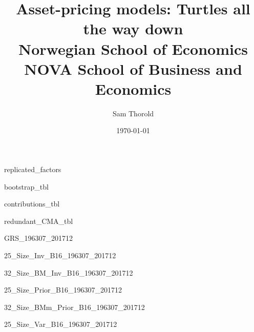 \documentclass[a4paper, 12pt]{article}
\title{
  {Asset-pricing models: Turtles all the way down}\\
  {\large Norwegian School of Economics}\\
  {\large NOVA School of Business and Economics}
}
\author{Sam Thorold}
\date{\today}
\begin{document}
\maketitle

{replicated_factors}

\begin{landscape}
{bootstrap_tbl}
\end{landscape}

{contributions_tbl}

{redundant_CMA_tbl}

{GRS_196307_201712}

{25_Size_Inv_B16_196307_201712}

\begin{landscape}
{32_Size_BM_Inv_B16_196307_201712}

\end{landscape}

{25_Size_Prior_B16_196307_201712}

\begin{landscape}
{32_Size_BMm_Prior_B16_196307_201712}
\end{landscape}

{25_Size_Var_B16_196307_201712}
\end{document}
